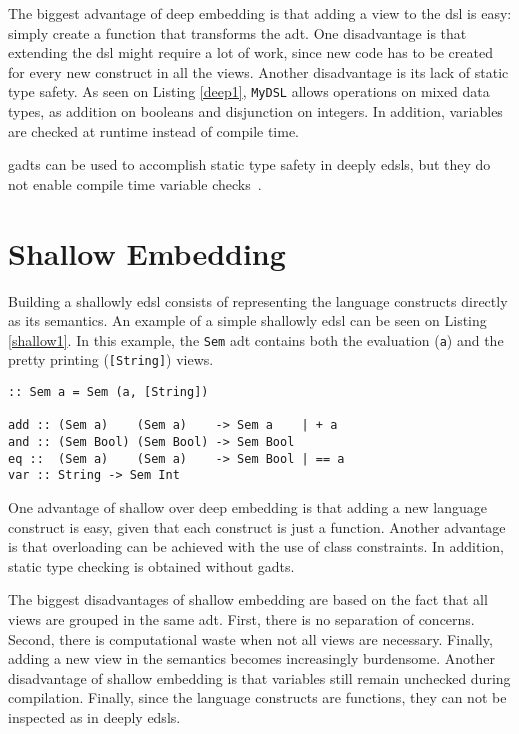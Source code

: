 The biggest advantage of deep embedding is that adding a view to the \ac{dsl} is easy: simply create a function that transforms the \ac{adt}. One disadvantage is that extending the \ac{dsl} might require a lot of work, since new code has to be created for every new construct in all the views. Another disadvantage is its lack of static type safety. As seen on Listing \ref{deep1}, \texttt{MyDSL} allows operations on mixed data types, as addition on booleans and disjunction on integers. In addition, variables are checked at runtime instead of compile time.

\acp{gadt} can be used to accomplish static type safety in deeply \acp{edsl}, but they do not enable compile time variable checks~\cite{gadts}. 

\section{Shallow Embedding}
Building a shallowly \ac{edsl} consists of representing the language constructs directly as its semantics. An example of a simple shallowly \ac{edsl} can be seen on Listing \ref{shallow1}. In this example, the \texttt{Sem} \ac{adt} contains both the evaluation (\texttt{a}) and the pretty printing (\texttt{[String]}) views.

\begin{lstlisting}[caption=A simple shallowly \ac{edsl},captionpos=b,label=shallow1]
:: Sem a = Sem (a, [String])

add :: (Sem a)    (Sem a)    -> Sem a    | + a
and :: (Sem Bool) (Sem Bool) -> Sem Bool
eq ::  (Sem a)    (Sem a)    -> Sem Bool | == a
var :: String -> Sem Int
\end{lstlisting}

One advantage of shallow over deep embedding is that adding a new language construct is easy, given that each construct is just a function. Another advantage is that overloading can be achieved with the use of class constraints. In addition, static type checking is obtained without \acp{gadt}. 

The biggest disadvantages of shallow embedding are based on the fact that all views are grouped in the same \ac{adt}. First, there is no separation of concerns. Second, there is computational waste when not all views are necessary. Finally, adding a new view in the semantics becomes increasingly burdensome. Another disadvantage of shallow embedding is that variables still remain unchecked during compilation. Finally, since the language constructs are functions, they can not be inspected as in deeply \acp{edsl}.


